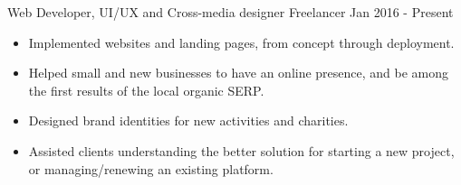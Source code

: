 \documentclass[11pt]{strongalecv}
\begin{document}
    \begin{MainPart}

    \Experience
        {\ColorTextMain}
		{Web Developer, UI/UX and Cross-media designer}
		{Freelancer}
        {\faCalendarO\space Jan 2016 - Present}
        {   
            \begin{itemize}[leftmargin=0.5cm, itemsep=0.1cm]
                \item [{\color{purple}\tiny\faSquare}] \small Implemented websites and landing pages, from concept through deployment.
                \item [{\color{purple}\tiny\faSquare}] \small Helped small and new businesses to have an online presence, and be among the first results of the local organic SERP.
                \item [{\color{purple}\tiny\faSquare}] \small Designed brand identities for new activities and charities.
                \item [{\color{purple}\tiny\faSquare}] \small Assisted clients understanding the better solution for starting a new project, or managing/renewing an existing platform.
            \end{itemize}
        }
        

\end{MainPart}
\end{document}
